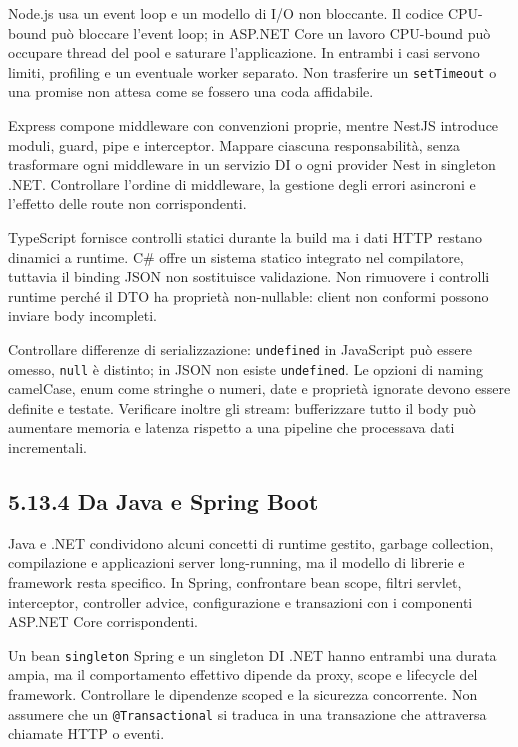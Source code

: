 \documentclass[
  italian,
  10pt,
]{book}
\begin{document}
Node.js usa un event loop e un modello di I/O non bloccante. Il codice
CPU-bound può bloccare l'event loop; in ASP.NET Core un lavoro CPU-bound
può occupare thread del pool e saturare l'applicazione. In entrambi i
casi servono limiti, profiling e un eventuale worker separato. Non
trasferire un \texttt{setTimeout} o una promise non attesa come se
fossero una coda affidabile.

Express compone middleware con convenzioni proprie, mentre NestJS
introduce moduli, guard, pipe e interceptor. Mappare ciascuna
responsabilità, senza trasformare ogni middleware in un servizio DI o
ogni provider Nest in singleton .NET. Controllare l'ordine di
middleware, la gestione degli errori asincroni e l'effetto delle route
non corrispondenti.

TypeScript fornisce controlli statici durante la build ma i dati HTTP
restano dinamici a runtime. C\# offre un sistema statico integrato nel
compilatore, tuttavia il binding JSON non sostituisce validazione. Non
rimuovere i controlli runtime perché il DTO ha proprietà non-nullable:
client non conformi possono inviare body incompleti.

Controllare differenze di serializzazione: \texttt{undefined} in
JavaScript può essere omesso, \texttt{null} è distinto; in JSON non
esiste \texttt{undefined}. Le opzioni di naming camelCase, enum come
stringhe o numeri, date e proprietà ignorate devono essere definite e
testate. Verificare inoltre gli stream: bufferizzare tutto il body può
aumentare memoria e latenza rispetto a una pipeline che processava dati
incrementali.

\subsection{5.13.4 Da Java e Spring Boot}\label{da-java-e-spring-boot}

Java e .NET condividono alcuni concetti di runtime gestito, garbage
collection, compilazione e applicazioni server long-running, ma il
modello di librerie e framework resta specifico. In Spring, confrontare
bean scope, filtri servlet, interceptor, controller advice,
configurazione e transazioni con i componenti ASP.NET Core
corrispondenti.

Un bean \texttt{singleton} Spring e un singleton DI .NET hanno entrambi
una durata ampia, ma il comportamento effettivo dipende da proxy, scope
e lifecycle del framework. Controllare le dipendenze scoped e la
sicurezza concorrente. Non assumere che un \texttt{@Transactional} si
traduca in una transazione che attraversa chiamate HTTP o eventi.
\end{document}
